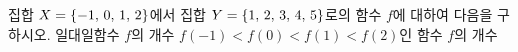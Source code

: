 \hspace*{2mm}\begin{minipage}[t]{\dimexpr\linewidth-2mm\relax}\vspace{0pt}
집합 $X=\{-1,\mkern3mu 0,\mkern3mu 1,\mkern3mu 2\}$에서 집합 $Y=\{1,\mkern3mu 2,\mkern3mu 3,\mkern3mu 4,\mkern3mu 5\}$로의 함수 $f$에 대하여 다음을 구하시오.
 일대일함수 $f$의 개수
 $f(-1)<f(0)<f(1)<f(2)$인 함수 $f$의 개수\end{minipage}
